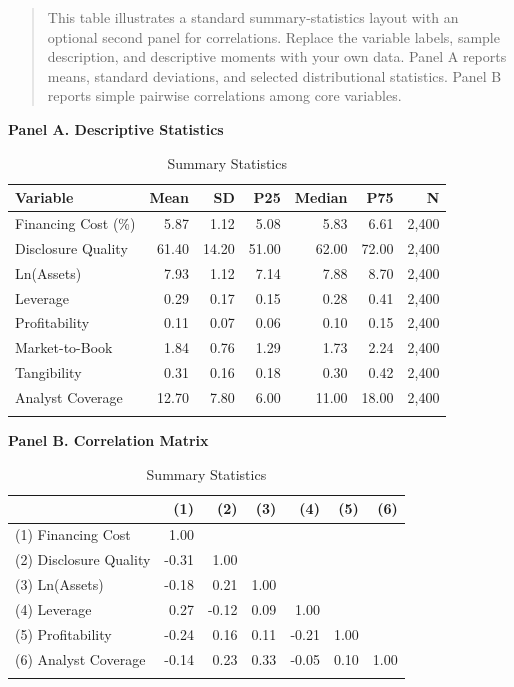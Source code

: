 \documentclass[hidelinks,12pt]{article}
\newcommand{\floatnotes}[1]{%
\begin{quotation}
\noindent \scriptsize #1
\end{quotation}
}
\begin{document}
\clearpage
\begin{table}[!htbp]
\centering
\caption{Summary Statistics}
\label{tab:summary}\vspace{-2.5ex}
\floatnotes{This table illustrates a standard summary-statistics layout with an optional second panel for correlations. Replace the variable labels, sample description, and descriptive moments with your own data. Panel A reports means, standard deviations, and selected distributional statistics. Panel B reports simple pairwise correlations among core variables.}
\setlength{\tabcolsep}{5pt}
\small

\textbf{Panel A. Descriptive Statistics}
\begin{tabularx}{\textwidth}{@{}Xrrrrrr@{}}
\\
\toprule
\textbf{Variable} & \textbf{Mean} & \textbf{SD} & \textbf{P25} & \textbf{Median} & \textbf{P75} & \textbf{N} \\
\midrule
Financing Cost (\%) & 5.87 & 1.12 & 5.08 & 5.83 & 6.61 & 2,400 \\
Disclosure Quality & 61.40 & 14.20 & 51.00 & 62.00 & 72.00 & 2,400 \\
Ln(Assets) & 7.93 & 1.12 & 7.14 & 7.88 & 8.70 & 2,400 \\
Leverage & 0.29 & 0.17 & 0.15 & 0.28 & 0.41 & 2,400 \\
Profitability & 0.11 & 0.07 & 0.06 & 0.10 & 0.15 & 2,400 \\
Market-to-Book & 1.84 & 0.76 & 1.29 & 1.73 & 2.24 & 2,400 \\
Tangibility & 0.31 & 0.16 & 0.18 & 0.30 & 0.42 & 2,400 \\
Analyst Coverage & 12.70 & 7.80 & 6.00 & 11.00 & 18.00 & 2,400 \\
\bottomrule
\\
\end{tabularx}

\medskip
\textbf{Panel B. Correlation Matrix}

\footnotesize
\begin{tabularx}{\textwidth}{@{}X*{6}{r}@{}}
\\
\toprule
 & (1) & (2) & (3) & (4) & (5) & (6) \\
\midrule
(1) Financing Cost & 1.00 &  &  &  &  &  \\
(2) Disclosure Quality & -0.31 & 1.00 &  &  &  &  \\
(3) Ln(Assets) & -0.18 & 0.21 & 1.00 &  &  &  \\
(4) Leverage & 0.27 & -0.12 & 0.09 & 1.00 &  &  \\
(5) Profitability & -0.24 & 0.16 & 0.11 & -0.21 & 1.00 &  \\
(6) Analyst Coverage & -0.14 & 0.23 & 0.33 & -0.05 & 0.10 & 1.00 \\
\bottomrule
\\
\end{tabularx}

\end{table}
\end{document}
